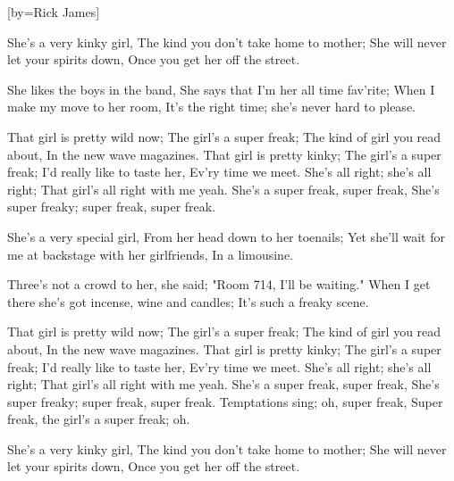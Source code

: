 

[by=Rick James]


\beginverse
She's a very kinky girl, The kind you don't take home to mother;
She will never let your spirits down, Once you get her off the street.

She likes the boys in the band, She says that I'm her all time fav'rite;
When I make my move to her room, It's the right time; she's never hard to please.

That girl is pretty wild now; The girl's a super freak;
The kind of girl you read about, In the new wave magazines.
That girl is pretty kinky; The girl's a super freak;
I'd really like to taste her, Ev'ry time we meet.
She's all right; she's all right; That girl's all right with me yeah.
She's a super freak, super freak, She's super freaky; super freak, super freak.
\endverse

\beginverse
She's a very special girl, From her head down to her toenails;
Yet she'll wait for me at backstage with her girlfriends, In a limousine.

Three's not a crowd to her, she said; "Room 714, I'll be waiting."
When I get there she's got incense, wine and candles; It's such a freaky scene.

That girl is pretty wild now; The girl's a super freak;
The kind of girl you read about, In the new wave magazines.
That girl is pretty kinky; The girl's a super freak;
I'd really like to taste her, Ev'ry time we meet.
She's all right; she's all right; That girl's all right with me yeah.
She's a super freak, super freak, She's super freaky; super freak, super freak.
Temptations sing; oh, super freak, Super freak, the girl's a super freak; oh.
\endverse

\beginverse
She's a very kinky girl, The kind you don't take home to mother;
She will never let your spirits down, Once you get her off the street.
\endverse



\chordson
\endsong
